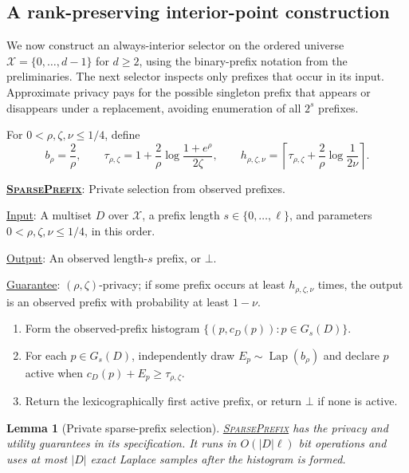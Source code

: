 \documentclass[11pt]{article}
\newenvironment{fminipage}%
  {\begin{Sbox}\begin{minipage}}%
  {\end{minipage}\end{Sbox}\fbox{\TheSbox}}
\newenvironment{algbox}[0]{%
\vskip 0.2in
\noindent
\begin{fminipage}{6.3in}
}{%
\end{fminipage}
\vskip 0.2in
}
\newtheorem{lemma}{Lemma}[section]
\begin{document}
\subsection{A rank-preserving interior-point construction}

We now construct an always-interior selector on the ordered universe
$\mathcal X=\{0,\ldots,d-1\}$ for $d\ge2$, using the binary-prefix notation
from the preliminaries.  The next selector inspects only prefixes that occur
in its input.  Approximate
privacy pays for the possible singleton prefix that appears or disappears
under a replacement, avoiding enumeration of all $2^s$ prefixes.

For $0<\rho,\zeta,\nu\le1/4$, define
\begin{equation}
 b_\rho=\frac2\rho,
 \qquad
 \tau_{\rho,\zeta}
 =1+\frac2\rho\log\frac{1+e^\rho}{2\zeta},
 \qquad
 h_{\rho,\zeta,\nu}
 =\left\lceil
   \tau_{\rho,\zeta}+\frac2\rho\log\frac1{2\nu}
  \right\rceil.
 \label{eq:sparse-thresholds}
\end{equation}
\begin{algbox}
\textbf{\uline{\textsc{SparsePrefix}}}: Private selection from observed
prefixes.  \label{alg:sparse-prefix}

\uline{Input}: A multiset $D$ over $\mathcal X$, a prefix length
$s\in\{0,\ldots,\ell\}$, and parameters
$0<\rho,\zeta,\nu\le1/4$, in this order.

\uline{Output}: An observed length-$s$ prefix, or $\bot$.

\uline{Guarantee}: $(\rho,\zeta)$-privacy; if some prefix occurs at least
$h_{\rho,\zeta,\nu}$ times, the output is an observed prefix with probability
at least $1-\nu$.

\begin{enumerate}[leftmargin=*,nosep]
  \item Form the observed-prefix histogram
  $\{(p,c_D(p)):p\in G_s(D)\}$.
  \item For each $p\in G_s(D)$, independently draw
  $E_p\sim\operatorname{Lap}(b_\rho)$ and declare $p$ active when
  $c_D(p)+E_p\ge\tau_{\rho,\zeta}$.
  \item Return the lexicographically first active prefix, or return $\bot$
  if none is active.
\end{enumerate}
\end{algbox}

\begin{lemma}[Private sparse-prefix selection]
\label{lem:sparse-prefix}
\hyperref[alg:sparse-prefix]{\textsc{SparsePrefix}} has the privacy and
utility guarantees in its specification.  It runs in $O(|D|\ell)$ bit
operations and uses at most $|D|$ exact Laplace samples after the histogram
is formed.
\end{lemma}
\end{document}
